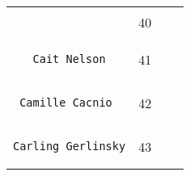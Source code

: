 \documentclass[]{article}
\begin{document}
\begin{longtable}[c]{@{}llll@{}}
\begin{minipage}[t]{0.39\columnwidth}
\begin{verbatim}
\end{verbatim}
\end{minipage} & \begin{minipage}[t]{0.10\columnwidth}\raggedright
40
\end{minipage} & \begin{minipage}[t]{0.13\columnwidth}\raggedright
\end{minipage} & \begin{minipage}[t]{0.15\columnwidth}\raggedright
\end{minipage}
\\\noalign{\medskip}
\begin{minipage}[t]{0.39\columnwidth}\raggedright
\begin{verbatim}
   Cait Nelson
\end{verbatim}
\end{minipage} & \begin{minipage}[t]{0.10\columnwidth}\raggedright
41
\end{minipage} & \begin{minipage}[t]{0.13\columnwidth}\raggedright
\end{minipage} & \begin{minipage}[t]{0.15\columnwidth}\raggedright
\end{minipage}
\\\noalign{\medskip}
\begin{minipage}[t]{0.39\columnwidth}\raggedright
\begin{verbatim}
 Camille Cacnio
\end{verbatim}
\end{minipage} & \begin{minipage}[t]{0.10\columnwidth}\raggedright
42
\end{minipage} & \begin{minipage}[t]{0.13\columnwidth}\raggedright
\end{minipage} & \begin{minipage}[t]{0.15\columnwidth}\raggedright
\end{minipage}
\\\noalign{\medskip}
\begin{minipage}[t]{0.39\columnwidth}\raggedright
\begin{verbatim}
Carling Gerlinsky
\end{verbatim}
\end{minipage} & \begin{minipage}[t]{0.10\columnwidth}\raggedright
43
\end{minipage} & \begin{minipage}[t]{0.13\columnwidth}\raggedright

\end{minipage}
\end{longtable}
\end{document}
